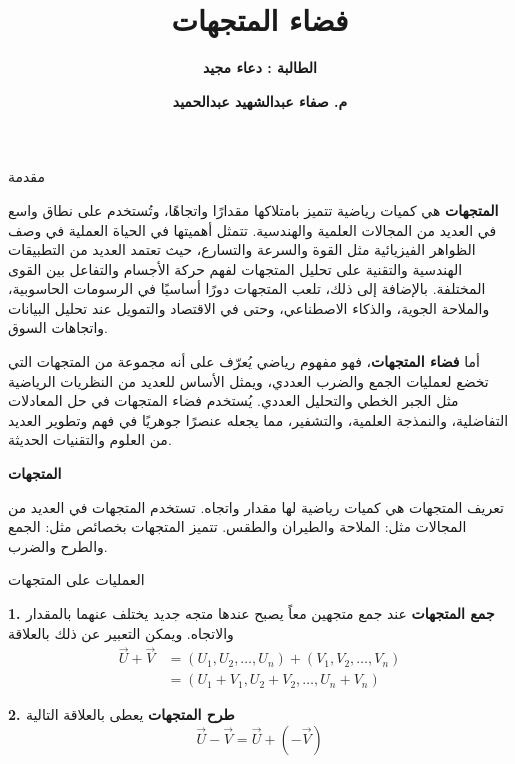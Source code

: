 

\author{\textbf{الطالبة : دعاء مجيد}}
\title{\textbf{فضاء المتجهات}}
\date{\textbf{م. صفاء عبدالشهيد عبدالحميد}}


\maketitle
\timesfont
\abovedisplayskip=7pt
\belowdisplayskip=7pt
\begin{frame}{مقدمة}
	
	\pause
	\noindent
	\textbf{المتجهات} هي كميات رياضية تتميز بامتلاكها مقدارًا واتجاهًا، وتُستخدم على نطاق واسع في العديد من المجالات العلمية والهندسية. تتمثل أهميتها في الحياة العملية في وصف الظواهر الفيزيائية مثل القوة والسرعة والتسارع، حيث تعتمد العديد من التطبيقات الهندسية والتقنية على تحليل المتجهات لفهم حركة الأجسام والتفاعل بين القوى المختلفة. بالإضافة إلى ذلك، تلعب المتجهات دورًا أساسيًا في الرسومات الحاسوبية، والملاحة الجوية، والذكاء الاصطناعي، وحتى في الاقتصاد والتمويل عند تحليل البيانات واتجاهات السوق.
	
	\pause
	\noindent
	أما \textbf{فضاء المتجهات}، فهو مفهوم رياضي يُعرّف على أنه مجموعة من المتجهات التي تخضع لعمليات الجمع والضرب العددي، ويمثل الأساس للعديد من النظريات الرياضية مثل الجبر الخطي والتحليل العددي. يُستخدم فضاء المتجهات في حل المعادلات التفاضلية، والنمذجة العلمية، والتشفير، مما يجعله عنصرًا جوهريًا في فهم وتطوير العديد من العلوم والتقنيات الحديثة.
\end{frame}

\begin{frame}
	\begin{center}
		\Huge
		\textbf{المتجهات}
	\end{center}
\end{frame}

\begin{frame}
	
	\pause
	\begin{exampleblock}{تعريف المتجهات}
		هي كميات رياضية لها مقدار واتجاه. تستخدم المتجهات في العديد من المجالات مثل: الملاحة والطيران والطقس. تتميز المتجهات بخصائص مثل: الجمع والطرح والضرب.
	\end{exampleblock}
	
	\pause
	\begin{exampleblock}{العمليات على المتجهات}
		
		\pause
		\textbf{1. جمع المتجهات}
		عند جمع متجهين معاً يصبح عندها متجه جديد يختلف عنهما بالمقدار والاتجاه. ويمكن التعبير عن ذلك بالعلاقة
		\begin{align*}
			\vec{U} + \vec{V} &= (U_1, U_2, \dots, U_n) + (V_1, V_2, \dots, V_n)\\
			&= (U_1+V_1, U_2+V_2, \dots, U_n+V_n)
		\end{align*}
		
		\pause
		\textbf{2. طرح المتجهات}
		يعطى بالعلاقة التالية
		\[
		\vec{U} - \vec{V} = \vec{U} + (-\vec{V})
		\]
	\end{exampleblock}
\end{frame}

